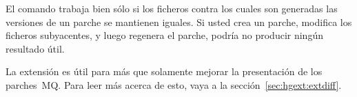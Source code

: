 \begin{note}
  El comando  trabaja bien sólo si los ficheros
  contra los cuales son generadas las versiones de un parche se
  mantienen iguales. Si usted crea un parche, modifica los ficheros
  subyacentes, y luego regenera el parche,  podría
  no producir ningún resultado útil.
\end{note}

La extensión  es útil para más que solamente mejorar la
presentación de los parches~MQ. Para leer más acerca de esto, vaya a
la sección~\ref{sec:hgext:extdiff}.

